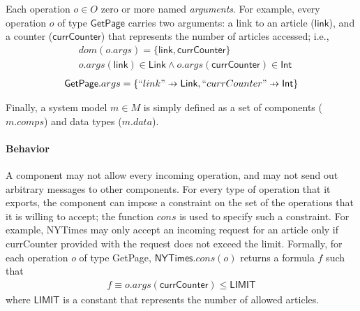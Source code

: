 



Each operation $o \in O$  zero or more
named \textit{arguments}. For example, every operation $o$ of type
$\textsf{GetPage}$ carries two arguments: a link to an article
($\textsf{link}$), and a counter ($\textsf{currCounter}$) that
represents the number of articles accessed; i.e.,
\begin{align*}
  &dom(o.args) = \{ \textsf{link}, \textsf{currCounter} \} \\
  &o.args(\textsf{link}) \in \textsf{Link} \land
  o.args(\textsf{currCounter}) \in \textsf{Int}
\end{align*}
\begin{align*}
  \textsf{GetPage}.args = \{ ``link" \pfun \textsf{Link}, ``currCounter" \pfun \textsf{Int} \}
\end{align*}

Finally, a system model $m \in M$ is simply defined as a set of components
($m.comps$) and data types ($m.data$). 

\paragraph{\textbf{Behavior}} A component may not allow every incoming
operation, and may not send out arbitrary messages to other
components. For every type of operation that it exports, the component can
impose a constraint on the set of the operations that it is willing to
accept; the function $cons$ is used to specify such a constraint. For
example, \textsf{NYTimes} may only accept an incoming request for an
article only if \textsf{currCounter} provided with the request does
not exceed the limit. Formally, for each operation $o$ of type
\textsf{GetPage}, $\textsf{NYTimes}.cons(o)$ returns a formula $f$
such that
\begin{align*}
f \equiv o.args(\textsf{currCounter}) \leq \textsf{LIMIT}
\end{align*}
where $\textsf{LIMIT}$ is a constant that represents the number of
allowed articles.

